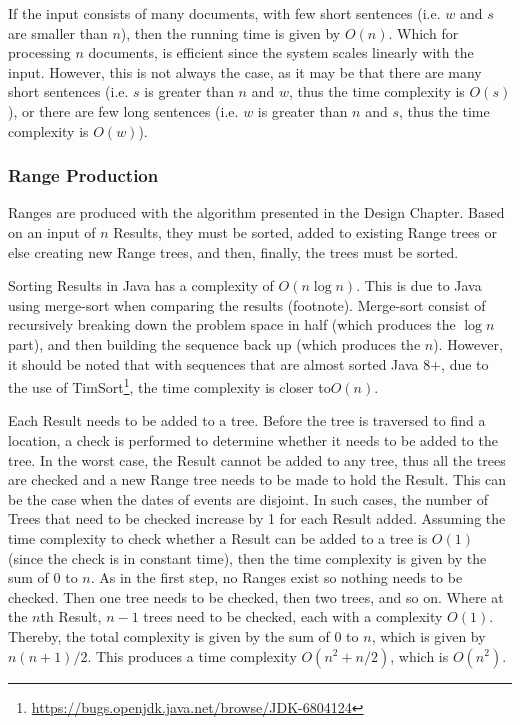 \par If the input consists of many documents, with few short sentences (i.e. $w$ and $s$ are smaller than $n$), then the running time is given by $O(n)$. Which for processing $n$ documents, is efficient since the system scales linearly with the input. However, this is not always the case, as it may be that there are many short sentences (i.e. $s$ is greater than $n$ and $w$, thus the time complexity is $O(s)$), or there are few long sentences (i.e. $w$ is greater than $n$ and $s$, thus the time complexity is $O(w)$).

\subsubsection{Range Production}
\par Ranges are produced with the algorithm presented in the Design Chapter. Based on an input of $n$ Results, they must be sorted, added to existing Range trees or else creating new Range trees, and then, finally, the trees must be sorted.

\par Sorting Results in Java has a complexity of $O(n\log n)$. This is due to Java using merge-sort when comparing the results (footnote). Merge-sort consist of recursively breaking down the problem space in half (which produces the $\log n$ part), and then building the sequence back up (which produces the $n$). However, it should be noted that with sequences that are almost sorted Java 8+, due to the use of TimSort\footnote{\url{https://bugs.openjdk.java.net/browse/JDK-6804124}}, the time complexity is closer to$O(n)$. 

\par Each Result needs to be added to a tree. Before the tree is traversed to find a location, a check is performed to determine whether it needs to be added to the tree. In the worst case, the Result cannot be added to any tree, thus all the trees are checked and a new Range tree needs to be made to hold the Result. This can be the case when the dates of events are disjoint.  In such cases, the number of Trees that need to be checked increase by 1 for each Result added. Assuming the time complexity to check whether a Result can be added to a tree is $O(1)$ (since the check is in constant time), then the time complexity is given by the sum of 0 to $n$. As in the first step, no Ranges exist so nothing needs to be checked. Then one tree needs to be checked, then two trees, and so on. Where at the $n$th Result, $n-1$ trees need to be checked, each with a complexity $O(1)$. Thereby, the total complexity is given by the sum of 0 to $n$, which is given by ${n(n+1)}/2$. This produces a time complexity $O({n^2+n}/2)$, which is $O(n^2)$.

